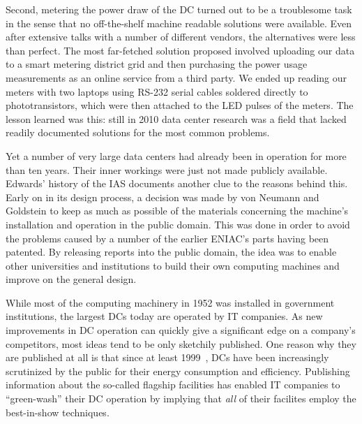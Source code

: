 \documentclass[officiallayout]{tktla}
\begin{document}
Second, metering the power draw of the DC turned out to be a troublesome task
in the sense that no off-the-shelf machine readable solutions were available.
Even after extensive talks with a number of different vendors, the
alternatives were less than perfect. The most far-fetched solution proposed
involved uploading our data to a smart metering district grid and then
purchasing the power usage measurements as an online service from a third
party. We ended up reading our meters with two laptops using RS-232 serial
cables soldered directly to phototransistors, which were then attached to the
LED pulses of the meters. The lesson learned was this: still in 2010 data
center research was a field that lacked readily documented solutions for the
most common problems.

Yet a number of very large data centers had already been in operation for more
than ten years. Their inner workings were just not made publicly available.
Edwards' history of the IAS documents another clue to the reasons behind this.
Early on in its design process, a decision was made by von Neumann and
Goldstein to keep as much as possible of the materials concerning the
machine's installation and operation in the public domain. This was done in
order to avoid the problems caused by a number of the earlier ENIAC's parts
having been patented. By releasing reports into the public domain, the idea
was to enable other universities and institutions to build their own computing
machines and improve on the general design. 

While most of the computing machinery in 1952 was installed in government
institutions, the largest DCs today are operated by IT companies. As new
improvements in DC operation can quickly give a significant edge on a
company's competitors, most ideas tend to be only sketchily published. One
reason why they are published at all is that since at least
1999~\cite{EPA2007,Huber1999}, DCs have been increasingly scrutinized by the
public for their energy consumption and efficiency.  Publishing information
about the so-called flagship facilities has enabled IT companies to
``green-wash'' their DC operation by implying that \emph{all} of their
facilites employ the best-in-show techniques.
\end{document}
